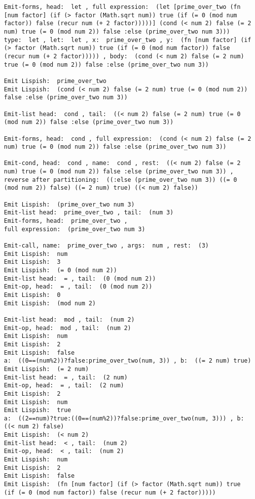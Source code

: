 \begin{verbatim}
Emit-forms, head:  let , full expression:  (let [prime_over_two (fn [num factor] (if (> factor (Math.sqrt num)) true (if (= 0 (mod num factor)) false (recur num (+ 2 factor)))))] (cond (< num 2) false (= 2 num) true (= 0 (mod num 2)) false :else (prime_over_two num 3)))
type:  let , let:  let , x:  prime_over_two , y:  (fn [num factor] (if (> factor (Math.sqrt num)) true (if (= 0 (mod num factor)) false (recur num (+ 2 factor))))) , body:  (cond (< num 2) false (= 2 num) true (= 0 (mod num 2)) false :else (prime_over_two num 3))

Emit Lispish:  prime_over_two
Emit Lispish:  (cond (< num 2) false (= 2 num) true (= 0 (mod num 2)) false :else (prime_over_two num 3))

Emit-list head:  cond , tail:  ((< num 2) false (= 2 num) true (= 0 (mod num 2)) false :else (prime_over_two num 3))

Emit-forms, head:  cond , full expression:  (cond (< num 2) false (= 2 num) true (= 0 (mod num 2)) false :else (prime_over_two num 3))

Emit-cond, head:  cond , name:  cond , rest:  ((< num 2) false (= 2 num) true (= 0 (mod num 2)) false :else (prime_over_two num 3)) , reverse after partitioning:  ((:else (prime_over_two num 3)) ((= 0 (mod num 2)) false) ((= 2 num) true) ((< num 2) false))

Emit Lispish:  (prime_over_two num 3)
Emit-list head:  prime_over_two , tail:  (num 3)
Emit-forms, head:  prime_over_two , 
full expression:  (prime_over_two num 3)

Emit-call, name:  prime_over_two , args:  num , rest:  (3)
Emit Lispish:  num
Emit Lispish:  3
Emit Lispish:  (= 0 (mod num 2))
Emit-list head:  = , tail:  (0 (mod num 2))
Emit-op, head:  = , tail:  (0 (mod num 2))
Emit Lispish:  0
Emit Lispish:  (mod num 2)

Emit-list head:  mod , tail:  (num 2)
Emit-op, head:  mod , tail:  (num 2)
Emit Lispish:  num
Emit Lispish:  2
Emit Lispish:  false
a:  ((0==(num%2))?false:prime_over_two(num, 3)) , b:  ((= 2 num) true)
Emit Lispish:  (= 2 num)
Emit-list head:  = , tail:  (2 num)
Emit-op, head:  = , tail:  (2 num)
Emit Lispish:  2
Emit Lispish:  num
Emit Lispish:  true
a:  ((2==num)?true:((0==(num%2))?false:prime_over_two(num, 3))) , b:  ((< num 2) false)
Emit Lispish:  (< num 2)
Emit-list head:  < , tail:  (num 2)
Emit-op, head:  < , tail:  (num 2)
Emit Lispish:  num
Emit Lispish:  2
Emit Lispish:  false
Emit Lispish:  (fn [num factor] (if (> factor (Math.sqrt num)) true (if (= 0 (mod num factor)) false (recur num (+ 2 factor)))))


\end{verbatim}

